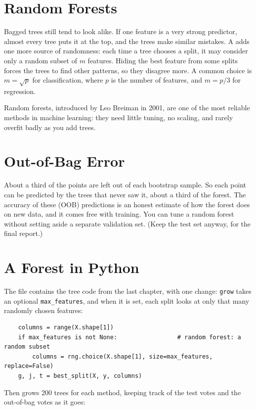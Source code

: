\section{Random Forests}
Bagged trees still tend to look alike. If one feature is a very strong predictor, almost every tree puts it at
the top, and the trees make similar mistakes. A  adds one more source of randomness: each
time a tree chooses a split, it may consider only a random subset of $m$ features. Hiding the best feature from
some splits forces the trees to find other patterns, so they disagree more. A common choice is
$m = \sqrt{p}$ for classification, where $p$ is the number of features, and $m = p/3$ for regression.

Random forests, introduced by Leo Breiman in 2001, are one of the most reliable methods in machine learning:
they need little tuning, no scaling, and rarely overfit badly as you add trees.

\section{Out-of-Bag Error}
About a third of the points are left out of each bootstrap sample. So each point can be predicted by the trees
that never saw it, about a third of the forest. The accuracy of these  (OOB) predictions is
an honest estimate of how the forest does on new data, and it comes free with training. You can tune a random
forest without setting aside a separate validation set. (Keep the test set anyway, for the final report.)

\section{A Forest in Python}
The file  contains the tree code from the last chapter, with one change: \verb|grow| takes an
optional \verb|max_features|, and when it is set, each split looks at only that many randomly chosen features:
\begin{verbatim}
    columns = range(X.shape[1])
    if max_features is not None:                 # random forest: a random subset
        columns = rng.choice(X.shape[1], size=max_features, replace=False)
    g, j, t = best_split(X, y, columns)
\end{verbatim}

Then  grows 200 trees for each method, keeping track of the test votes and the out-of-bag
votes as it goes:

